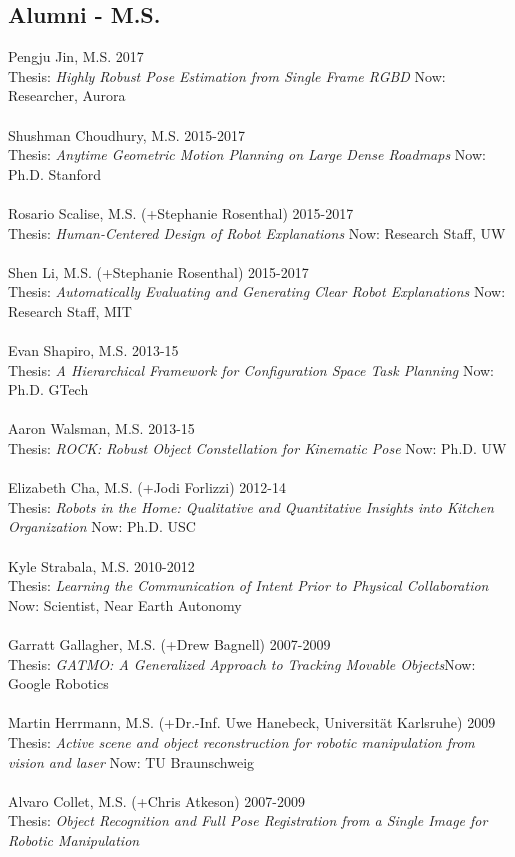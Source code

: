 \subsection{Alumni - M.S.}
\noindent
Pengju Jin, M.S. \hfill 2017\\
Thesis: \textit{Highly Robust Pose Estimation from Single Frame RGBD}
\hfill Now: Researcher, Aurora\\
\\
Shushman Choudhury, M.S. \hfill 2015-2017\\
Thesis: \textit{Anytime Geometric Motion Planning on Large Dense Roadmaps} \hfill Now: Ph.D. Stanford\\
\\
Rosario Scalise, M.S. (+Stephanie Rosenthal) \hfill 2015-2017\\
Thesis: \textit{Human-Centered Design of Robot Explanations} \hfill Now: Research Staff, UW\\
\\
Shen Li, M.S. (+Stephanie Rosenthal) \hfill 2015-2017\\
Thesis: \textit{Automatically Evaluating and Generating Clear Robot Explanations} \hfill Now: Research Staff, MIT\\
\\
Evan Shapiro, M.S.  \hfill 2013-15\\
Thesis: \textit{A Hierarchical Framework for Configuration Space Task Planning} \hfill Now: Ph.D. GTech\\
\\
Aaron Walsman, M.S.  \hfill 2013-15\\
Thesis: \textit{ROCK: Robust Object Constellation for Kinematic Pose} \hfill Now: Ph.D. UW\\
\\
Elizabeth Cha, M.S. (+Jodi Forlizzi)  \hfill 2012-14\\
Thesis: \textit{Robots in the Home: Qualitative and Quantitative Insights into Kitchen Organization} \hfill Now: Ph.D. USC\\
\\
Kyle Strabala, M.S. \hfill 2010-2012\\
Thesis: \textit{Learning the Communication of Intent Prior to Physical Collaboration} \hfill Now: Scientist, Near Earth Autonomy\\
\\
Garratt Gallagher, M.S. (+Drew Bagnell) \hfill 2007-2009\\ 
Thesis: \textit{GATMO: A Generalized Approach to Tracking Movable Objects}\hfill Now: Google Robotics\\
\\
Martin Herrmann, M.S. (+Dr.-Inf. Uwe Hanebeck, Universit\"at Karlsruhe) \hfill 2009\\
Thesis: \textit{Active scene and object reconstruction for robotic manipulation from vision and laser} \hfill Now: TU Braunschweig\\
\\
Alvaro Collet, M.S. (+Chris Atkeson) \hfill 2007-2009\\
Thesis: \textit{Object Recognition and Full Pose Registration from a Single Image for Robotic Manipulation}\\
